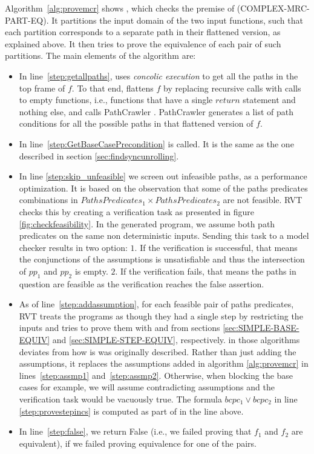 Algorithm~\ref{alg:provemcr} shows 
, which checks the premise of (COMPLEX-MRC-PART-EQ). It partitions the input domain of the two input functions, such that each partition corresponds to a separate path in their flattened version, as explained above. It then tries to prove the equivalence of each pair of such partitions. The main elements of the algorithm are: 
\begin{itemize}
    \item In line~\ref{step:getallpaths},
     uses \emph{concolic execution} to get all the paths in the top frame of $f$. To that end,  flattens $f$ by replacing recursive calls with calls to empty functions, i.e., functions that have a single $return$ statement and nothing else, and calls PathCrawler \cite{10.1007/11408901_21}. PathCrawler generates a list of path conditions for all the possible paths in that flattened version of $f$.  
    \item In line~\ref{step:GetBaseCasePrecondition}  is called. It is the same as the one described in section \ref{sec:findsyncunrolling}.
    \item In line \ref{step:skip_unfeasible} we screen out infeasible paths, as a performance optimization. It is based on the observation that some of the paths predicates combinations in $PathsPredicates_1 \times PathsPredicates_2$ are not feasible. RVT checks this by creating a verification task as presented in figure \ref{fig:checkfeasibility}. In the generated program, we assume both path predicates on the same non deterministic inputs. Sending this task to a model checker results in two option: $1.$ If the verification is successful, that means the conjunctions of the assumptions is unsatisfiable and thus the intersection of $pp_1$ and $pp_2$ is empty. $2.$ If the verification fails, that means the paths in question are feasible as the verification reaches the false assertion.
    
    \item As of line~\ref{step:addassumption}, for each feasible pair of paths predicates, RVT treats the programs as though they had a single step by restricting the inputs and tries to prove them with  and  from sections \ref{sec:SIMPLE-BASE-EQUIV} and \ref{sec:SIMPLE-STEP-EQUIV}, respectively.  in those algorithms deviates from how is was originally described. Rather than just adding the assumptions, it replaces the assumptions added in algorithm \ref{alg:provemcr} in lines~\ref{step:assmp1} and~\ref{step:assmp2}. Otherwise, when blocking the base cases for example, we will assume contradicting assumptions and the verification task would be vacuously true. The formula $bcpc_1\lor bcpc_2$ in line \ref{step:provestepincs} is computed as part of   in the line above. 
    
    \item In line~\ref{step:false}, we return False (i.e., we failed proving that $f_1$ and $f_2$ are equivalent), if we failed proving equivalence for one of the pairs. 
\end{itemize}


